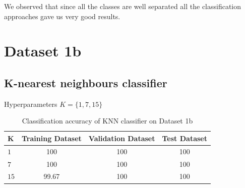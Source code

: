 \documentclass[11pt]{article}
\begin{document}
We observed that since all the classes are well separated all the classification approaches gave us very good results.
\newpage

\section{Dataset 1b}
\subsection{K-nearest neighbours classifier}
Hyperparameters $K = \{1,7,15\}$
\begin{table}[h!]
\label{tab:tab1.1.1}
\begin{center}
\begin{tabular}{|l|c|c|c|}
\hline
\textbf{K } & \textbf{Training Dataset} & \textbf{Validation Dataset} &\textbf{Test Dataset}\\
\hline
$1$ & 100 & 100 & 100\\
\hline
$7$ & 100 & 100 & 100\\
\hline
$15$ & 99.67 & 100 & 100\\
\hline
\end{tabular}
\caption{Classification accuracy of KNN classifier on Dataset 1b}
\end{center}
\end{table}
\end{document}
